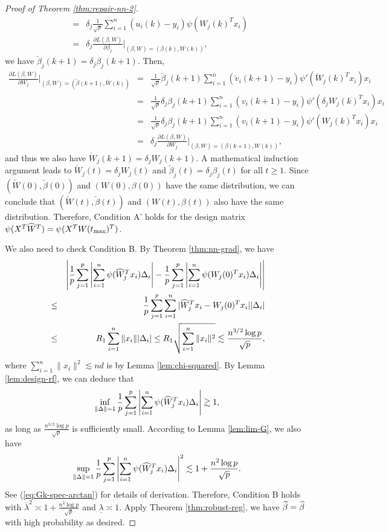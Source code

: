 \begin{proof}[Proof of Theorem \ref{thm:repair-nn-2}]
\begin{eqnarray*}
&=& \delta_j\frac{1}{\sqrt{p}}\sum_{i=1}^n({u}_i(k)-y_i)\psi({W}_j(k)^Tx_i) \\
&=& \delta_j\frac{\partial L(\beta,W)}{\partial \beta_j}|_{(\beta,W)=({\beta}(k),{W}(k))},
\end{eqnarray*}
we have $\check{\beta}_j(k+1)=\delta_j\beta_j(k+1)$.
Then,
\begin{eqnarray*}
\frac{\partial L(\beta,W)}{\partial W_j}|_{(\beta,W)=(\check{\beta}(k+1),\check{W}(k))} &=& \frac{1}{\sqrt{p}}\check{\beta}_j(k+1)\sum_{i=1}^n(\check{v}_i(k+1)-y_i)\psi'(\check{W}_j(k)^Tx_i)x_i \\
&=& \frac{1}{\sqrt{p}}\delta_j{\beta}_j(k+1)\sum_{i=1}^n({v}_i(k+1)-y_i)\psi'(\delta_j{W}_j(k)^Tx_i)x_i \\
&=& \frac{1}{\sqrt{p}}\delta_j{\beta}_j(k+1)\sum_{i=1}^n({v}_i(k+1)-y_i)\psi'({W}_j(k)^Tx_i)x_i \\
&=& \delta_j\frac{\partial L(\beta,W)}{\partial W_j}|_{(\beta,W)=({\beta}(k+1),{W}(k))},
\end{eqnarray*}
and thus we also have $\check{W}_j(k+1)=\delta_jW_j(k+1)$. A mathematical induction argument leads to $\check{W}_j(t)=\delta_jW_j(t)$ and $\check{\beta}_j(t)=\delta_j\beta_j(t)$ for all $t\geq 1$. Since $(\check{W}(0),\check{\beta}(0))$ and $(W(0),\beta(0))$ have the same distribution, we can conclude that $(\check{W}(t),\check{\beta}(t))$ and $(W(t),\beta(t))$ also have the same distribution. Therefore, Condition A' holds for the design matrix $\psi(X^T\widehat{W}^T)=\psi(X^TW(t_{\max})^T)$.

We also need to check Condition B. By Theorem \ref{thm:nn-grad}, we have
\begin{eqnarray*}
&& \left|\frac{1}{p}\sum_{j=1}^p\left|\sum_{i=1}^n\psi(\wh{W}_j^Tx_i)\Delta_i\right| - \frac{1}{p}\sum_{j=1}^p\left|\sum_{i=1}^n\psi(W_j(0)^Tx_i)\Delta_i\right|\right| \\
&\leq& \frac{1}{p}\sum_{j=1}^p\sum_{i=1}^n|\wh{W}_j^Tx_i-W_j(0)^Tx_i||\Delta_i| \\
&\leq& R_1\sum_{i=1}^n\|x_i\||\Delta_i| \leq R_1\sqrt{\sum_{i=1}^n\|x_i\|^2} \lesssim \frac{n^{3/2}\log p}{\sqrt{p}},
\end{eqnarray*}
where $\sum_{i=1}^n\|x_i\|^2\lesssim nd$ is by Lemma \ref{lem:chi-squared}. By Lemma \ref{lem:design-rf}, we can deduce that
$$\inf_{\|\Delta\|=1}\frac{1}{p}\sum_{j=1}^p\left|\sum_{i=1}^n\psi(\widehat{W}_j^Tx_i)\Delta_i\right|\gtrsim 1,$$
as long as $\frac{n^{3/2}\log p}{\sqrt{p}}$ is sufficiently small. 
According to Lemma \ref{lem:lim-G}, we also have
$$\sup_{\|\Delta\|=1}\frac{1}{p}\sum_{j=1}^p\left|\sum_{i=1}^n\psi(\widehat{W}_j^Tx_i)\Delta_i\right|^2\lesssim 1+\frac{n^2\log p}{\sqrt{p}}.$$
See (\ref{eq:Gk-spec-arctan}) for details of derivation.
Therefore, Condition B holds with $\overline{\lambda}^2\asymp 1+\frac{n^2\log p}{\sqrt{p}}$ and $\underline{\lambda}\asymp 1$. Apply Theorem \ref{thm:robust-reg}, we have $\widetilde{\beta}=\widehat{\beta}$ with high probability as desired.
\end{proof}
